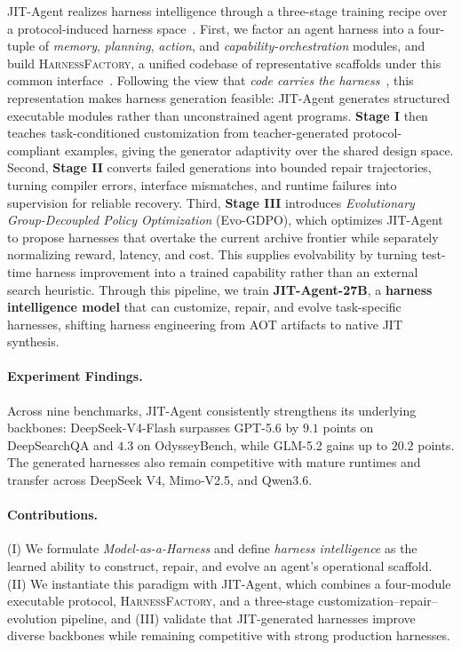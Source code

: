 \documentclass{article}
\newcommand{\ourmethod}{JIT-Agent\xspace}
\begin{document}
\ourmethod realizes harness intelligence through a three-stage training recipe over a protocol-induced harness space~\citep{meng2026agent,zhou2026externalizationllmagentsunified}.
First, we factor an agent harness into a four-tuple of \textit{memory}, \textit{planning}, \textit{action}, and \textit{capability-orchestration} modules, and build \textsc{HarnessFactory}, a unified codebase of representative scaffolds under this common interface~\citep{hu2025memoryageaiagentssurvey,erdogan2025plan,yao2023reactsynergizingreasoningacting,xu2026agentskillslargelanguage}.
Following the view that \textit{code carries the harness}~\citep{ning2026code,pan2026natural}, this representation makes harness generation feasible: \ourmethod{} generates structured executable modules rather than unconstrained agent programs.
\textbf{ Stage I} then teaches task-conditioned customization from teacher-generated protocol-compliant examples, giving the generator adaptivity over the shared design space.
Second, \textbf{ Stage II} converts failed generations into bounded repair trajectories, turning compiler errors, interface mismatches, and runtime failures into supervision for reliable recovery.
Third, \textbf{ Stage III} introduces \textit{Evolutionary Group-Decoupled Policy Optimization} (Evo-GDPO), which optimizes \ourmethod{} to propose harnesses that overtake the current archive frontier while separately normalizing reward, latency, and cost.
This supplies evolvability by turning test-time harness improvement into a trained capability rather than an external search heuristic.
Through this pipeline, we train \textbf{JIT-Agent-27B}, a \textbf{harness intelligence model} that can customize, repair, and evolve task-specific harnesses, shifting harness engineering from AOT artifacts to native JIT synthesis.

\vspace{-0.5em}
\paragraph{Experiment Findings.}
Across nine benchmarks, \ourmethod consistently strengthens its underlying backbones: DeepSeek-V4-Flash surpasses GPT-5.6 by $9.1$ points on DeepSearchQA and $4.3$ on OdysseyBench, while GLM-5.2 gains up to $20.2$ points. The generated harnesses also remain competitive with mature runtimes and transfer across DeepSeek V4, Mimo-V2.5, and Qwen3.6.

\vspace{-0.5em}
\paragraph{Contributions.} (I) We formulate \textit{Model-as-a-Harness} and define \textit{harness intelligence} as the learned ability to construct, repair, and evolve an agent's operational scaffold. (II) We instantiate this paradigm with \ourmethod, which combines a four-module executable protocol, \textsc{HarnessFactory}, and a three-stage customization--repair--evolution pipeline, and (III) validate that JIT-generated harnesses improve diverse backbones while remaining competitive with strong production harnesses.
\end{document}
